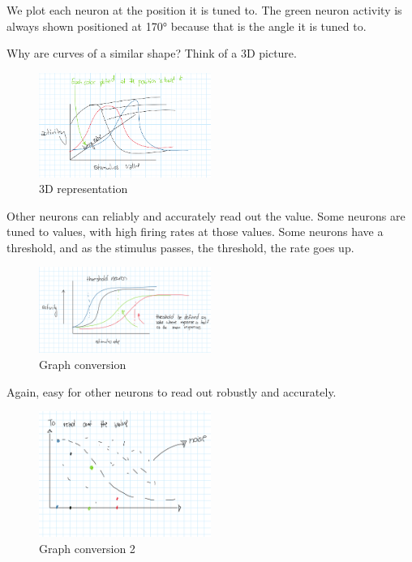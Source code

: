 \documentclass{article}
\begin{document}
We plot each neuron at the position it is tuned to. The green neuron activity is always shown positioned at 170° because that is the angle it is tuned to.

Why are curves of a similar shape? Think of a 3D picture.

\begin{figure}[H]
\centering
\includegraphics[width=0.5\textwidth]{assets/multipleGraph.png}
\caption{3D representation}
\end{figure}

Other neurons can reliably and accurately read out the value. Some neurons are tuned to values, with high firing rates at those values. Some neurons have a threshold, and as the stimulus passes, the threshold, the rate goes up.

\begin{figure}[H]
\centering
\includegraphics[width=0.5\textwidth]{assets/graphConversion.png}
\caption{Graph conversion}
\end{figure}

Again, easy for other neurons to read out robustly and accurately.

\begin{figure}[H]
\centering
\includegraphics[width=0.5\textwidth]{assets/graphConversion2.png}
\caption{Graph conversion 2}
\end{figure}
\end{document}

